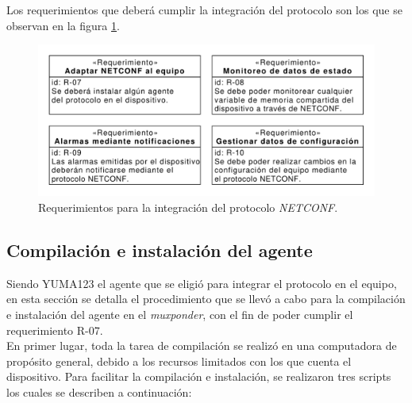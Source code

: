   Los requerimientos que deberá cumplir la integración del protocolo son los que se observan en la figura \ref{fig:req_netconf}.

  \begin{figure}[H]
    \centering
    \includegraphics[scale=0.65]{Figures/req_netconf.pdf}
    \caption{Requerimientos para la integración del protocolo \textit{NETCONF}.}
    \label{fig:req_netconf}
  \end{figure}


  \subsection{Compilación e instalación del agente}
Siendo YUMA123 el agente que se eligió para integrar el protocolo en el equipo, en esta sección se detalla el procedimiento que se llevó a cabo para la compilación e instalación del agente en el \textit{muxponder}, con el fin de poder cumplir el requerimiento R-07.
\\

  En primer lugar, toda la tarea de compilación se realizó en una computadora de propósito general, debido a los recursos limitados con los que cuenta el dispositivo. Para facilitar la compilación e instalación, se realizaron tres scripts los cuales se describen a continuación:

